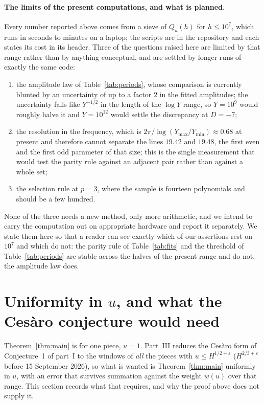 \documentclass[11pt,a4paper]{article}
\theoremstyle{remark}\newtheorem{remark}[theorem]{Remark}
\begin{document}
\paragraph{The limits of the present computations, and what is planned.} Every number reported above comes from a
sieve of $Q_u(h)$ for $h\le10^7$, which runs in seconds to minutes on a laptop; the scripts are in the repository and
each states its cost in its header. Three of the questions raised here are limited by that range rather than by
anything conceptual, and are settled by longer runs of exactly the same code:
\begin{enumerate}
\item the amplitude law of Table~\ref{tab:periods}, whose comparison is currently blunted by an uncertainty of up to a
factor $2$ in the fitted amplitudes; the uncertainty falls like $Y^{-1/2}$ in the length of the $\log Y$ range, so
$Y=10^9$ would roughly halve it and $Y=10^{12}$ would settle the discrepancy at $D=-7$;
\item the resolution in the frequency, which is $2\pi/\log(Y_{\max}/Y_{\min})\approx0.68$ at present and therefore
cannot separate the lines $19.42$ and $19.48$, the first even and the first odd parameter of that size; this is the
single measurement that would test the parity rule against an adjacent pair rather than against a whole set;
\item the selection rule at $p=3$, where the sample is fourteen polynomials and should be a few hundred.
\end{enumerate}
None of the three needs a new method, only more arithmetic, and we intend to carry the computation out on
appropriate hardware and report it separately. We state them here so that a reader can see exactly which of our
assertions rest on $10^7$ and which do not: the parity rule of Table~\ref{tab:fits} and the threshold of
Table~\ref{tab:periods} are stable across the halves of the present range and do not, the amplitude law does.

\section{Uniformity in $u$, and what the Ces\`aro conjecture would need}\label{sec:uniformity}

Theorem~\ref{thm:main} is for one piece, $u=1$. Part~III reduces the Ces\`aro form of Conjecture~1 of part~I to the
windows of \emph{all} the pieces with $u\le H^{1/2+\varepsilon}$ ($H^{2/3+\varepsilon}$ before 15 September 2026), so what is wanted is Theorem~\ref{thm:main} uniformly
in $u$, with an error that survives summation against the weight $w(u)$ over that range. This section records what
that requires, and why the proof above does not supply it.
\end{document}
